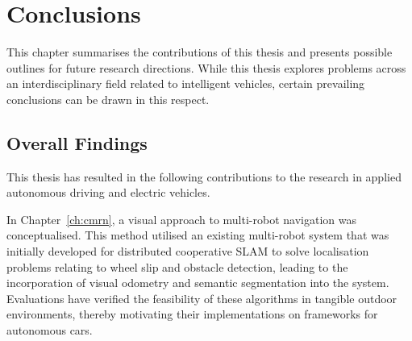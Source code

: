 
\chapter{Conclusions}
\label{ch:conclu}

\ifpdf
	\graphicspath{{Chapter11/Figs/Raster/}{Chapter11/Figs/PDF/}{Chapter11/Figs/}}
\else
	\graphicspath{{Chapter11/Figs/Vector/}{Chapter11/Figs/}}
\fi

This chapter summarises the contributions of this thesis and presents possible outlines for future research directions. While this thesis explores problems across an interdisciplinary field related to intelligent vehicles, certain prevailing conclusions can be drawn in this respect.

\section{Overall Findings}
This thesis has resulted in the following contributions to the research in applied autonomous driving and electric vehicles. 

In Chapter~\ref{ch:cmrn}, a visual approach to multi-robot navigation was conceptualised. This method utilised an existing multi-robot system that was initially developed for distributed cooperative SLAM to solve localisation problems relating to wheel slip and obstacle detection, leading to the incorporation of visual odometry and semantic segmentation into the system. Evaluations have verified the feasibility of these algorithms in tangible outdoor environments, thereby motivating their implementations on frameworks for autonomous cars.

